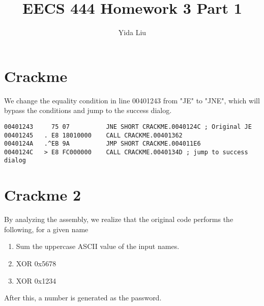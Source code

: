 \documentclass[11pt]{article}
\begin{document}
\author{Yida Liu}
\title{EECS 444 Homework 3 Part 1}
\maketitle

\section{Crackme}

We change the equality condition in line 00401243 from "JE" to "JNE", which will bypass the conditions and jump to the success dialog.

\begin{lstlisting}[language={[x86masm]Assembler}]
00401243     75 07          JNE SHORT CRACKME.0040124C ; Original JE
00401245   . E8 18010000    CALL CRACKME.00401362
0040124A   .^EB 9A          JMP SHORT CRACKME.004011E6
0040124C   > E8 FC000000    CALL CRACKME.0040134D ; jump to success dialog
\end{lstlisting}

\section{Crackme 2}

By analyzing the assembly, we realize that the original code performs the following, for a given name
\begin{enumerate}
    \item Sum the uppercase ASCII value of the input names.
    \item XOR 0x5678
    \item XOR 0x1234
\end{enumerate}
After this, a number is generated as the password.
\end{document}

